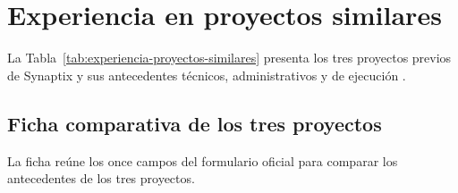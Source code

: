 \documentclass[11pt,letterpaper]{report}
\begin{document}
\tableofcontents
\clearpage

\chapter*{Experiencia en proyectos similares}
La Tabla~\ref{tab:experiencia-proyectos-similares} presenta los tres proyectos previos de Synaptix y sus antecedentes técnicos, administrativos y de ejecución \parencite[art.~34.1, p.~22; Formulario T-6, p.~56]{bases-admin}.

\section*{Ficha comparativa de los tres proyectos}
La ficha reúne los once campos del formulario oficial para comparar los antecedentes de los tres proyectos.
\end{document}
